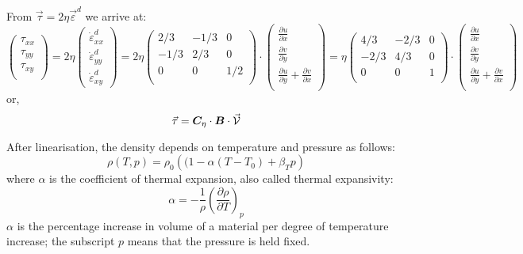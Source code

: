 From $\vec{\tau} = 2\eta \vec{\varepsilon}^d$ we arrive at:
\[
\left(
\begin{array}{c}
\tau_{xx}\\
\tau_{yy}\\
\tau_{xy}\\
\end{array}
\right)
=
2\eta
\left(
\begin{array}{c}
\dot{\varepsilon}_{xx}^d \\
\dot{\varepsilon}_{yy}^d \\
\dot{\varepsilon}_{xy}^d 
\end{array}
\right)
=2 \eta
\left(
\begin{array}{ccc}
2/3 & -1/3& 0 \\
-1/3 & 2/3 & 0 \\
0 & 0 & 1/2 \\
\end{array}
\right)
\cdot 
\left(
\begin{array}{c}
\frac{\partial u}{\partial x} \\ 
\frac{\partial v}{\partial y} \\ 
\frac{\partial u}{\partial y}\! +\! \frac{\partial v}{\partial x} \\
\end{array}
\right)
=
\eta
\left(
\begin{array}{ccc}
4/3 & -2/3& 0 \\
-2/3 & 4/3 & 0 \\
0 & 0 & 1 \\
\end{array}
\right)
\cdot 
\left(
\begin{array}{c}
\frac{\partial u}{\partial x} \\ 
\frac{\partial v}{\partial y} \\ 
\frac{\partial u}{\partial y}\! +\! \frac{\partial v}{\partial x} \\
\end{array}
\right)
\]
or, 
\[
\vec{\tau} = {\bm C}_\eta \cdot  {\bm B} \cdot \vec{\cal V}
\]





After linearisation, the density depends on temperature and pressure as follows:
\[
\rho(T,p) = \rho_0 \left((1 - \alpha(T-T_0) + \beta_T p \right)
\]
where $\alpha$ is the coefficient of thermal expansion, also called 
thermal expansivity: 
\[
\alpha=-\frac{1}{\rho}\left( \frac{\partial \rho}{\partial T} \right)_p
\]
$\alpha$ is the percentage increase in volume of a material per degree of temperature increase; the
subscript $p$ means that the pressure is held fixed.

